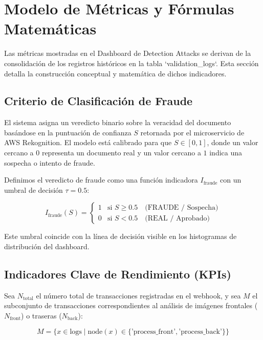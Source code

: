 \section{Modelo de Métricas y Fórmulas Matemáticas}
\label{sec:metrics}

Las métricas mostradas en el Dashboard de Detection Attacks se derivan de la consolidación de los registros históricos en la tabla `validation\_logs`. Esta sección detalla la construcción conceptual y matemática de dichos indicadores.

\subsection{Criterio de Clasificación de Fraude}
El sistema asigna un veredicto binario sobre la veracidad del documento basándose en la puntuación de confianza $S$ retornada por el microservicio de AWS Rekognition. El modelo está calibrado para que $S \in [0, 1]$, donde un valor cercano a $0$ representa un documento real y un valor cercano a $1$ indica una sospecha o intento de fraude.

Definimos el veredicto de fraude como una función indicadora $I_{\text{fraude}}$ con un umbral de decisión $\tau = 0.5$:

\begin{equation}
I_{\text{fraude}}(S) = \begin{cases} 
1 & \text{si } S \ge 0.5 \quad \text{(FRAUDE / Sospecha)} \\
0 & \text{si } S < 0.5 \quad \text{(REAL / Aprobado)}
\end{cases}
\end{equation}

Este umbral coincide con la línea de decisión visible en los histogramas de distribución del dashboard.

\subsection{Indicadores Clave de Rendimiento (KPIs)}
Sea $N_{\text{total}}$ el número total de transacciones registradas en el webhook, y sea $M$ el subconjunto de transacciones correspondientes al análisis de imágenes frontales ($N_{\text{front}}$) o traseras ($N_{\text{back}}$):

\begin{equation}
M = \{x \in \text{logs} \mid \text{node}(x) \in \{\text{'process\_front'}, \text{'process\_back'}\} \}
\end{equation}

